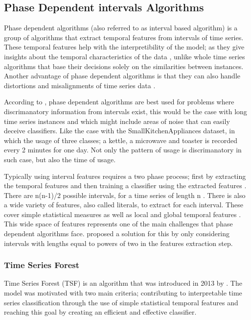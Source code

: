 \subsection{Phase Dependent intervals Algorithms}
\label{SubsectionPhaseDependent}
Phase dependent algorithms (also referred to as interval based algorithm) is a group of algorithms that extract temporal features from intervals of time series.
These temporal features help with the interpretibility of the model; as they give insights about the temporal characteristics of the data \cite{baydogan2016time},
unlike whole time series algorithms that base their decisions solely on the similarities between instances.
Another advantage of phase dependent algorithms is that they can also handle distortions and misalignments of time series data \cite{deng2013time}.

According to \cite{bagnall2017great}, phase dependent algorithms are best used for problems where discrimanatory information from intervals exist,
this would be the case with long time series instances and which might include areas of noise that can easily deceive classifiers.
Like the case with the SmallKitchenAppliances dataset, in which the usage of three classes; a kettle, a microwave and toaster is recorded every 2 minutes for one day.
Not only the pattern of usage is discrimanatory in such case, but also the time of usage.

Typically using interval features requires a two phase process; first by extracting the temporal features and then training a classifier using the extracted features \cite{deng2013time}.
There are n(n-1)/2 possible intervals, for a time series of length n \cite{bagnall2017great}.
There is also a wide variety of features, also called literals, to extract for each interval. These cover simple statistical measures as well as local and global temporal features \cite{santos2016literature,rodriguez2004support,deng2013time}.
This wide space of features represents one of the main challenges that phase dependent algorithms face.
\cite{rodriguez2004support} proposed a solution for this by only considering intervals with lengths equal to powers of two \cite{bagnall2017great} in the features extraction step.

\subsubsection{Time Series Forest}
\label{SubsubsectionTimeSeriesForest}
Time Series Forest (TSF) is an algorithm that was introduced in 2013 by \cite{deng2013time}.
The model was motivated with two main criteria; contributing to interpretable time series classification through
the use of simple statistical temporal features and reaching this goal by creating an efficient and effective classifier.

